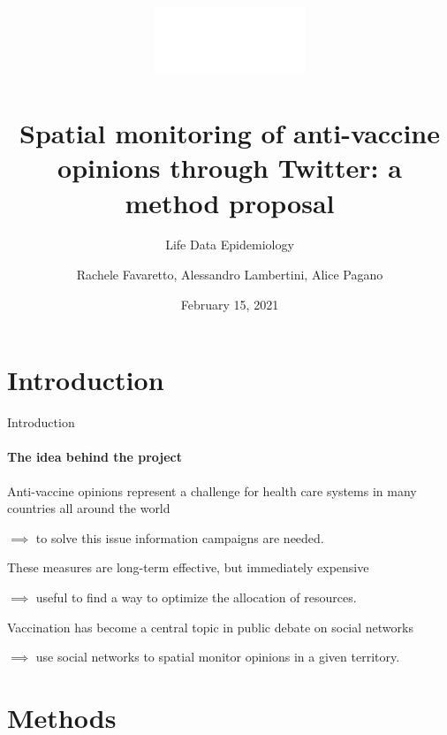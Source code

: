 \documentclass[9pt]{beamer}
\title[\fontfamily{\sfdefault}\selectfont Spatial monitoring of anti-vaccine opinions]{
	\includegraphics[height=2cm]{images/logo/unipd_logo_white.png}\\
	~\\
	\textbf{
		Spatial monitoring of anti-vaccine opinions through Twitter: a method proposal
	}
}
\subtitle{\fontfamily{\sfdefault}\selectfont Life Data Epidemiology}
\author[\fontfamily{\sfdefault}\selectfont Favaretto, Lambertini, Pagano]{Rachele Favaretto, Alessandro Lambertini, Alice Pagano}
\date{\fontfamily{\sfdefault}\selectfont February 15, 2021}
\begin{document}
	\maketitle

%
%		


	\section{Introduction}
	
	\begin{frame}[c]{Introduction}
	\framesubtitle{The idea behind the project}

	\medskip
	
    \alert{Anti-vaccine opinions} represent a \alert{challenge} for \alert{health care systems} in many countries all around the world
    
    \medskip
    
    $\implies$ to solve this issue \alert{information campaigns} are needed. 
    
    \medskip 
    
    These measures are long-term effective, but immediately \alert{expensive}
    
    \medskip
    
    $\implies$ useful to find a way to \alert{optimize} the \alert{allocation of resources}.
	
	\medskip
	\medskip
	\medskip
	
	\pause
	
	\medskip
	
	\alert{Vaccination} has become a \alert{central topic} in public debate on \alert{social networks} 
	
	\medskip
	
	$\implies$ use social networks to \alert{spatial monitor opinions} in a given territory.
	
	\end{frame}
	
% 
	
	
	\section{Methods}
	
\end{document}
